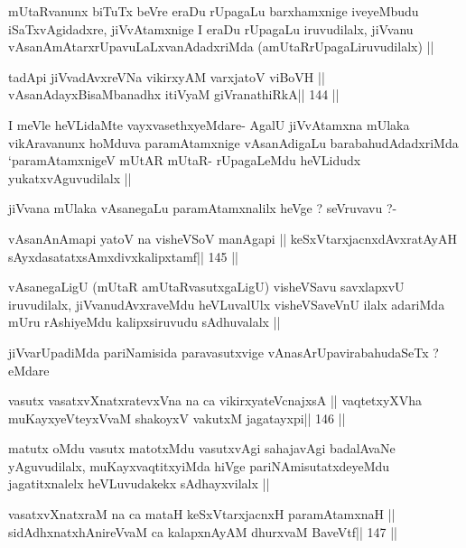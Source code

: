 \begin{artha}
mUtaRvanunx biTuTx beVre eraDu rUpagaLu barxhamxnige iveyeMbudu
iSaTxvAgidadxre, jiVvAtamxnige I eraDu rUpagaLu iruvudilalx, jiVvanu
vAsanAmAtarxrUpavuLaLxvanAdadxriMda (amUtaRrUpagaLiruvudilalx) ||
\end{artha}

\begin{shl}
tadA\s pi jiVvadAvxreVNa vikirxyAM varxjatoV viBoVH ||
vAsanAdayxBisaMbanadhx itiVyaM giVranathiRkA\hfill || 144 ||
\end{shl}

\begin{artha}
I meVle heVLidaMte vayxvasethxyeMdare- AgalU jiVvAtamxna mUlaka
vikAravanunx hoMduva paramAtamxnige vAsanAdigaLu barabahudAdadxriMda
`paramAtamxnigeV mUtAR mUtaR- rUpagaLeMdu heVLidudx yukatxvAguvudilalx
||

jiVvana mUlaka vAsanegaLu paramAtamxnalilx heVge ? seVruvavu ?-
\end{artha}

\begin{shl}
vAsanAnAmapi yatoV na visheVSoV manAgapi ||
keSxVtarxjacnxdAvxratAyAH sAyxdasatatxsAmxdivxkalipxtamf\hfill || 145 ||
\end{shl}

\begin{artha}
vAsanegaLigU (mUtaR amUtaRvasutxgaLigU) visheVSavu savxlapxvU
iruvudilalx, jiVvanudAvxraveMdu heVLuvalUlx visheVSaveVnU ilalx
adariMda mUru rAshiyeMdu kalipxsiruvudu sAdhuvalalx ||
\end{artha}

\begin{artha}
jiVvarUpadiMda pariNamisida paravasutxvige vAnasArUpavirabahudaSeTx ? eMdare
\end{artha}

\begin{shl}
vasutx vasatxvXnatxratevxVna na ca vikirxyateV\s cnajxsA ||
vaqtetxyXVha muKayxyeVteyxVvaM shakoyxV vakutxM jagatayxpi\hfill || 146 ||
\end{shl}

\begin{artha}
matutx oMdu vasutx matotxMdu vasutxvAgi sahajavAgi badalAvaNe
yAguvudilalx, muKayxvaqtitxyiMda hiVge pariNAmisutatxdeyeMdu
jagatitxnalelx heVLuvudakekx sAdhayxvilalx ||
\end{artha}

\begin{shl}
vasatxvXnatxraM na ca mataH keSxVtarxjacnxH paramAtamxnaH ||
sidAdhxnatxhAnireVvaM ca kalapxnAyAM dhurxvaM BaveVtf\hfill || 147 ||
\end{shl}

